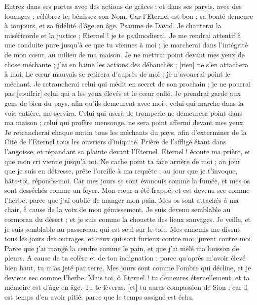 \begin{multicols}{2}
Entrez dans ses portes avec des actions de grâces ; et dans ses parvis, avec des louanges ; célébrez-le, bénissez son Nom.
Car l'Eternel est bon ; sa bonté demeure à toujours, et sa fidélité d'âge en âge.
\VerseOne{}Psaume de David. Je chanterai la miséricorde et la justice ; Eternel ! je te psalmodierai.
Je me rendrai attentif à une conduite pure jusqu’à ce que tu viennes à moi ; je marcherai dans l'intégrité de mon cœur, au milieu de ma maison.
Je ne mettrai point devant mes yeux de chose méchante ; j'ai en haine les actions des débauchés ; [rien] ne s'en attachera à moi.
Le cœur mauvais se retirera d'auprès de moi ; je n'avouerai point le méchant.
Je retrancherai celui qui médit en secret de son prochain ; je ne pourrai pas [souffrir] celui qui a les yeux élevés et le cœur enflé.
Je prendrai garde aux gens de bien du pays, afin qu'ils demeurent avec moi ; celui qui marche dans la voie entière, me servira.
Celui qui usera de tromperie ne demeurera point dans ma maison ; celui qui profère mensonge, ne sera point affermi devant mes yeux.
Je retrancherai chaque matin tous les méchants du pays, afin d'exterminer de la Cité de l'Eternel tous les ouvriers d'iniquité.
\VerseOne{}Prière de l'affligé étant dans l'angoisse, et répandant sa plainte devant l'Eternel. Eternel ! écoute ma prière, et que mon cri vienne jusqu’à toi.
Ne cache point ta face arrière de moi ; au jour que je suis en détresse, prête l'oreille à ma requête ; au jour que je t'invoque, hâte-toi, réponds-moi.
Car mes jours se sont évanouis comme la fumée, et mes os sont desséchés comme un foyer.
Mon cœur a été frappé, et est devenu sec comme l'herbe, parce que j'ai oublié de manger mon pain.
Mes os sont attachés à ma chair, à cause de la voix de mon gémissement.
Je suis devenu semblable au cormoran du désert ; et je suis comme la chouette des lieux sauvages.
Je veille, et je suis semblable au passereau, qui est seul sur le toit.
Mes ennemis me disent tous les jours des outrages, et ceux qui sont furieux contre moi, jurent contre moi.
Parce que j'ai mangé la cendre comme le pain, et que j'ai mêlé ma boisson de pleurs.
A cause de ta colère et de ton indignation : parce qu'après m'avoir élevé bien haut, tu m'as jeté par terre.
Mes jours sont comme l'ombre qui décline, et je deviens sec comme l'herbe.
Mais toi, ô Eternel ! tu demeures éternellement, et ta mémoire est d'âge en âge.
Tu te lèveras, [et] tu auras compassion de Sion ; car il est temps d'en avoir pitié, parce que le temps assigné est échu.

\end{multicols}
